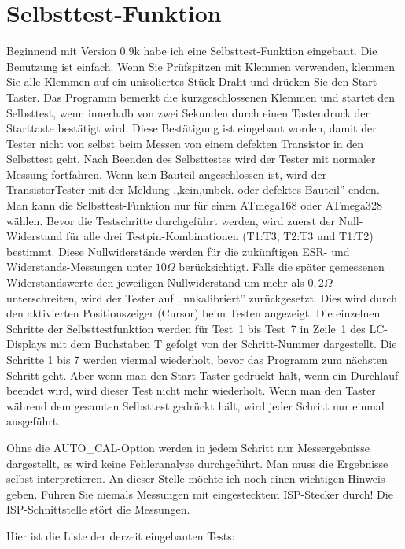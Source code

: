 
\section{Selbsttest-Funktion}
\label{sec:selftest}
Beginnend mit Version 0.9k habe ich eine Selbsttest-Funktion eingebaut.
Die Benutzung ist einfach.
Wenn Sie Prüfspitzen mit Klemmen verwenden, klemmen Sie alle Klemmen auf ein unisoliertes Stück Draht und drücken Sie
den Start-Taster.
Das Programm bemerkt die kurzgeschlossenen Klemmen und startet den Selbsttest, wenn innerhalb von
zwei Sekunden durch einen Tastendruck der Starttaste bestätigt wird. Diese Bestätigung ist eingebaut
worden, damit der Tester nicht von selbst beim Messen von einem defekten Transistor in den Selbsttest geht.
Nach Beenden des Selbsttestes wird der Tester mit normaler Messung fortfahren.
Wenn kein Bauteil angeschlossen ist, wird der TransistorTester mit der
Meldung ,,kein,unbek. oder defektes Bauteil'' enden.
Man kann die Selbsttest-Funktion nur für einen ATmega168 oder ATmega328 wählen.
Bevor die Testschritte durchgeführt werden, wird zuerst der Null-Widerstand für alle drei Testpin-Kombinationen
(T1:T3, T2:T3 und T1:T2) bestimmt. Diese Nullwiderstände werden für die zukünftigen ESR- und Widerstands-Messungen
unter \(10\Omega\) berücksichtigt.
Falls die später gemessenen Widerstandswerte den jeweiligen Nullwiderstand um mehr als \(0,2\Omega\) unterschreiten,
wird der Tester auf ,,unkalibriert'' zurückgesetzt. 
Dies wird durch den aktivierten Positionszeiger (Cursor)  beim Testen angezeigt.
Die einzelnen Schritte der Selbsttestfunktion werden für Test~1 bis Test~7 in Zeile~1 des LC-Displays mit dem Buchstaben T
gefolgt von der Schritt-Nummer dargestellt.
Die Schritte 1 bis 7 werden viermal wiederholt, bevor das Programm zum nächsten Schritt geht.
Aber wenn man den Start Taster gedrückt hält, wenn ein Durchlauf beendet wird, wird dieser Test nicht
mehr wiederholt.
Wenn man den Taster während dem gesamten Selbsttest gedrückt hält, wird jeder Schritt nur einmal ausgeführt.

Ohne die AUTO\_CAL-Option werden in jedem Schritt nur Messergebnisse dargestellt, es wird keine Fehleranalyse durchgeführt.
Man  muss die Ergebnisse selbst interpretieren.
An dieser Stelle möchte ich noch einen wichtigen Hinweis geben. Führen Sie niemals Messungen mit
eingestecktem ISP-Stecker durch!
Die ISP-Schnittstelle stört die Messungen.

\vspace{1cm}
Hier ist die Liste der derzeit eingebauten Tests:
\vspace{1cm}

